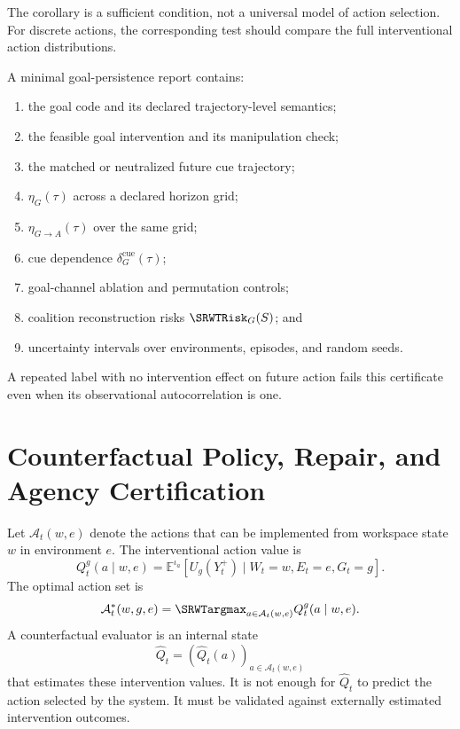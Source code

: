 The corollary is a sufficient condition, not a universal model of action
selection. For discrete actions, the corresponding test should compare the
full interventional action distributions.


A minimal goal-persistence report contains:
\begin{enumerate}
\item the goal code and its declared trajectory-level semantics;
\item the feasible goal intervention and its manipulation check;
\item the matched or neutralized future cue trajectory;
\item \(\eta_G(\tau)\) across a declared horizon grid;
\item \(\eta_{G\to A}(\tau)\) over the same grid;
\item cue dependence \(\delta_G^{\mathrm{cue}}(\tau)\);
\item goal-channel ablation and permutation controls;
\item coalition reconstruction risks \(\SRWTRisk_G(S)\); and
\item uncertainty intervals over environments, episodes, and random seeds.
\end{enumerate}
A repeated label with no intervention effect on future action fails this
certificate even when its observational autocorrelation is one.

\section{Counterfactual Policy, Repair, and Agency Certification}


Let \(\mathcal A_t(w,e)\) denote the actions that can be implemented from
workspace state \(w\) in environment \(e\). The interventional action value is
\[
Q_t^g(a\mid w,e)
=
\mathbb E^{\iota_a}
\left[
U_g(Y_t^+)
\mid
W_t=w,
E_t=e,
G_t=g
\right].
\]
The optimal action set is
\[
\mathcal A_t^*(w,g,e)
=
\SRWTargmax_{a\in\mathcal A_t(w,e)}Q_t^g(a\mid w,e).
\]
A counterfactual evaluator is an internal state
\[
\widehat Q_t
=
\left(
\widehat Q_t(a)
\right)_{a\in\mathcal A_t(w,e)}
\]
that estimates these intervention values. It is not enough for
\(\widehat Q_t\) to predict the action selected by the system. It must be
validated against externally estimated intervention outcomes.

